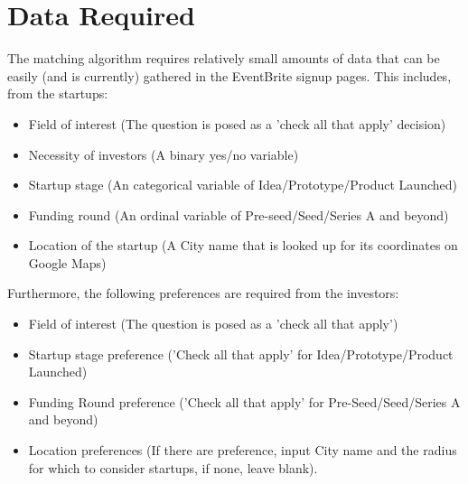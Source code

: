 \documentclass{article}
\begin{document}
\section*{Data Required}
The matching algorithm requires relatively small amounts of data that can be easily (and is currently) gathered in the EventBrite signup pages. This includes, from the startups:
\begin{itemize}
\itemsep-0.3em 
	\item Field of interest (The question is posed as a 'check all that apply' decision)
	\item Necessity of investors (A binary yes/no variable)
	\item Startup stage (An categorical variable of Idea/Prototype/Product Launched)
	\item Funding round (An ordinal variable of Pre-seed/Seed/Series A and beyond)
	\item Location of the startup (A City name that is looked up for its coordinates on Google Maps)
\end{itemize}
Furthermore, the following preferences are required from the investors:
\begin{itemize}
\itemsep-0.3em 
	\item Field of interest (The question is posed as a 'check all that apply')
	\item Startup stage preference ('Check all that apply' for Idea/Prototype/Product Launched)
	\item Funding Round preference ('Check all that apply' for Pre-Seed/Seed/Series A and beyond)
	\item Location preferences (If there are preference, input City name and the radius for which to consider startups, if none, leave blank).
\end{itemize}
\end{document}

